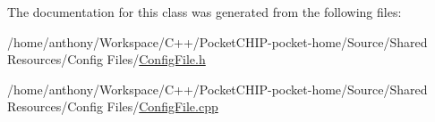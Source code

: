 The documentation for this class was generated from the following files\+:\begin{DoxyCompactItemize}
\item 
/home/anthony/\+Workspace/\+C++/\+Pocket\+C\+H\+I\+P-\/pocket-\/home/\+Source/\+Shared Resources/\+Config Files/\mbox{\hyperlink{ConfigFile_8h}{Config\+File.\+h}}\item 
/home/anthony/\+Workspace/\+C++/\+Pocket\+C\+H\+I\+P-\/pocket-\/home/\+Source/\+Shared Resources/\+Config Files/\mbox{\hyperlink{ConfigFile_8cpp}{Config\+File.\+cpp}}\end{DoxyCompactItemize}
